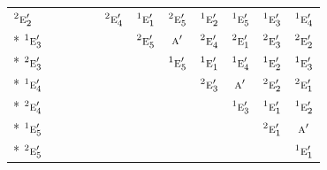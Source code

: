 \documentclass[10pt,a4paper]{article}
\numberwithin{equation}{section}
\newcommand{\irr}[1]{\text{\normalfont\scshape #1}}
\newcommand{\conjpair}[1]{{}^{#1}}
\begin{document}
{\begin{longtable}{@{}lccccccccccc@{}}
$\conjpair{2}\irr{e}_{2}'$ &  &  &  &  & $\conjpair{2}\irr{e}_{4}'$ & $\conjpair{1}\irr{e}_{1}'$ & $\conjpair{2}\irr{e}_{5}'$ & $\conjpair{1}\irr{e}_{2}'$ & $\conjpair{1}\irr{e}_{5}'$ & $\conjpair{1}\irr{e}_{3}'$ & $\conjpair{1}\irr{e}_{4}'$\\*
$\conjpair{1}\irr{e}_{3}'$ &  &  &  &  &  & $\conjpair{2}\irr{e}_{5}'$ & $\irr{a}'$ & $\conjpair{2}\irr{e}_{4}'$ & $\conjpair{2}\irr{e}_{1}'$ & $\conjpair{2}\irr{e}_{3}'$ & $\conjpair{2}\irr{e}_{2}'$\\*
$\conjpair{2}\irr{e}_{3}'$ &  &  &  &  &  &  & $\conjpair{1}\irr{e}_{5}'$ & $\conjpair{1}\irr{e}_{1}'$ & $\conjpair{1}\irr{e}_{4}'$ & $\conjpair{1}\irr{e}_{2}'$ & $\conjpair{1}\irr{e}_{3}'$\\*
$\conjpair{1}\irr{e}_{4}'$ &  &  &  &  &  &  &  & $\conjpair{2}\irr{e}_{3}'$ & $\irr{a}'$ & $\conjpair{2}\irr{e}_{2}'$ & $\conjpair{2}\irr{e}_{1}'$\\*
$\conjpair{2}\irr{e}_{4}'$ &  &  &  &  &  &  &  &  & $\conjpair{1}\irr{e}_{3}'$ & $\conjpair{1}\irr{e}_{1}'$ & $\conjpair{1}\irr{e}_{2}'$\\*
$\conjpair{1}\irr{e}_{5}'$ &  &  &  &  &  &  &  &  &  & $\conjpair{2}\irr{e}_{1}'$ & $\irr{a}'$\\*
$\conjpair{2}\irr{e}_{5}'$ &  &  &  &  &  &  &  &  &  &  & $\conjpair{1}\irr{e}_{1}'$\\
\bottomrule\end{longtable}}
\end{document}
